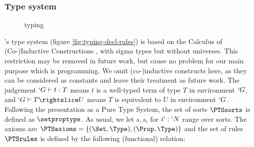 \documentclass{llncs}
\begin{document}
\subsubsection{Type system}
\begin{figure}[t]
  \begin{center}
    \def\infvspace{0.1in}
    \def\seq{\typed}
    \def\fCenter{\wf}
    
    \WfEmpty\DP\WfVar\DP

    \def\fCenter{\typed}
    \vspace{\infvspace}

    \Var\DP\PropSet\DP
    
    \vspace{\infvspace}
    \Subsum\DP
       
    \vspace{\infvspace}
    \Prod\DP
    
    \vspace{\infvspace}
    \Abs\DP

    \vspace{\infvspace}
    \App\DP

    \vspace{\infvspace}
    \SigmaR\DP
    
    \vspace{\infvspace}
    \SumDep\DP

    \vspace{\infvspace}
    \PiLeft\DP
    \quad
    \PiRight\DP

    \vspace{\infvspace}
    \SubsetR\DP
  \end{center}
  \vspace{-2em}
  \caption{\Russell{} typing}
  \label{fig:typing-decl-rules}
  \vspace{-1em}
\end{figure}
%
\Russell{}'s type system (figure \vref{fig:typing-decl-rules}) is based
on the Calculus of (Co-)Inductive Constructions
\cite{coquandhuet88}, with sigma types but without universes.
This restriction may be removed in future work, but cause no problem for
our main purpose which is programming. We omit (co-)inductive
constructs here, as they can be considered as constants and leave their
treatment as future work. The judgement $`G \vdash t : T$
means $t$ is a well-typed term of type $T$ in environment $`G$, and $`G
\typed T \subd U$ means $T$ is equivalent to $U$ in environment $`G$. 
Following the presentation as a Pure Type System, 
the set of sorts $\PTSsorts$ is defined as $\setproptype$. As usual, we
let $s, s_i$ for $i `: `N$ range over sorts. The
axioms are $\PTSaxioms = \{ (\Set, \Type), (\Prop, \Type) \}$ and the
set of rules $\PTSrules$ is defined by the following (functional) relation:
  \axiomsd
\end{document}
